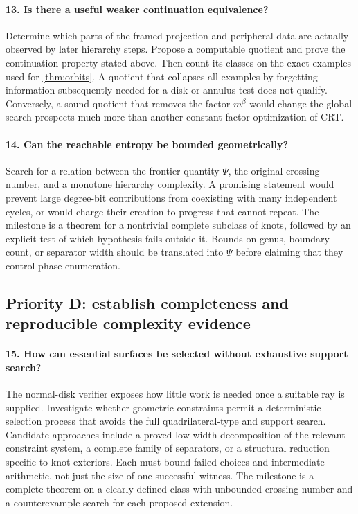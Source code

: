 \paragraph{13. Is there a useful weaker continuation equivalence?}
Determine which parts of the framed projection and peripheral data are
actually observed by later hierarchy steps. Propose a computable quotient
and prove the continuation property stated above. Then count its classes
on the exact examples used for \cref{thm:orbits}. A quotient that collapses
all examples by forgetting information subsequently needed for a disk or
annulus test does not qualify. Conversely, a sound quotient that removes
the factor $m^\beta$ would change the global search prospects much more
than another constant-factor optimization of CRT.

\paragraph{14. Can the reachable entropy be bounded geometrically?}
Search for a relation between the frontier quantity $\Psi$, the original
crossing number, and a monotone hierarchy complexity. A promising statement
would prevent large degree-bit contributions from coexisting with many
independent cycles, or would charge their creation to progress that cannot
repeat. The milestone is a theorem for a nontrivial complete subclass of
knots, followed by an explicit test of which hypothesis fails outside it.
Bounds on genus, boundary count, or separator width should be translated
into $\Psi$ before claiming that they control phase enumeration.

\subsection{Priority D: establish completeness and reproducible complexity evidence}

\paragraph{15. How can essential surfaces be selected without exhaustive support search?}
The normal-disk verifier exposes how little work is needed once a suitable
ray is supplied. Investigate whether geometric constraints permit a
deterministic selection process that avoids the full quadrilateral-type
and support search. Candidate approaches include a proved low-width
decomposition of the relevant constraint system, a complete family of
separators, or a structural reduction specific to knot exteriors. Each must
bound failed choices and intermediate arithmetic, not just the size of one
successful witness. The milestone is a complete theorem on a clearly
defined class with unbounded crossing number and a counterexample search
for each proposed extension.

